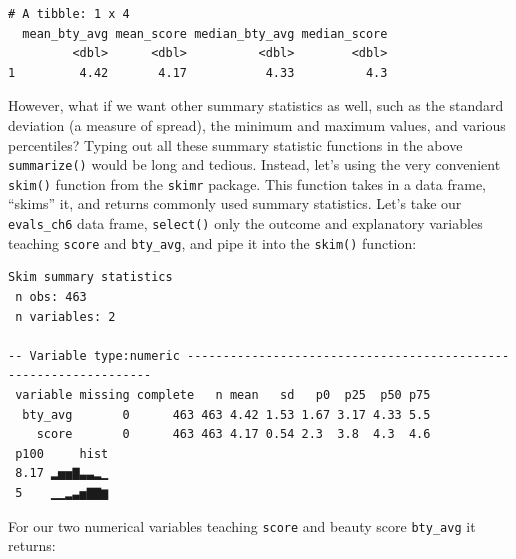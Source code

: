 \documentclass[12pt, krantz2,]{krantz}
\makeatletter
\newenvironment{Shaded}{\begin{snugshade}}{\end{snugshade}}
\newcommand{\KeywordTok}[1]{\textcolor[rgb]{0.27,0.27,0.27}{\textbf{#1}}}
\newcommand{\NormalTok}[1]{#1}
\newcommand{\OperatorTok}[1]{\textcolor[rgb]{0.43,0.43,0.43}{\textbf{#1}}}
\newcommand{\StringTok}[1]{\textcolor[rgb]{0.5,0.5,0.5}{#1}}
\newenvironment{kframe}{%
\medskip{}
\setlength{\fboxsep}{.8em}
 \def\at@end@of@kframe{}%
 \ifinner\ifhmode%
  \def\at@end@of@kframe{\end{minipage}}%
  \begin{minipage}{\columnwidth}%
 \fi\fi%
 \def\FrameCommand##1{\hskip\@totalleftmargin \hskip-\fboxsep
 \colorbox{shadecolor}{##1}\hskip-\fboxsep
     \hskip-\linewidth \hskip-\@totalleftmargin \hskip\columnwidth}%
 \MakeFramed {\advance\hsize-\width
   \@totalleftmargin\z@ \linewidth\hsize
   \@setminipage}}%
 {\par\unskip\endMakeFramed%
 \at@end@of@kframe}
\renewenvironment{Shaded}{\begin{kframe}}{\end{kframe}}
\makeatother
\begin{document}
\begin{verbatim}
# A tibble: 1 x 4
  mean_bty_avg mean_score median_bty_avg median_score
         <dbl>      <dbl>          <dbl>        <dbl>
1         4.42       4.17           4.33          4.3
\end{verbatim}

However, what if we want other summary statistics as well, such as the standard deviation (a measure of spread), the minimum and maximum values, and various percentiles? Typing out all these summary statistic functions in the above \texttt{summarize()} would be long and tedious. Instead, let's using the very convenient \texttt{skim()} function from the \texttt{skimr} package. This function takes in a data frame, ``skims'' it, and returns commonly used summary statistics. Let's take our \texttt{evals\_ch6} data frame, \texttt{select()} only the outcome and explanatory variables teaching \texttt{score} and \texttt{bty\_avg}, and pipe it into the \texttt{skim()} function:

\begin{Shaded}
\end{Shaded}

\begin{verbatim}
Skim summary statistics
 n obs: 463 
 n variables: 2 

-- Variable type:numeric -----------------------------------------------------------------
 variable missing complete   n mean   sd   p0  p25  p50 p75
  bty_avg       0      463 463 4.42 1.53 1.67 3.17 4.33 5.5
    score       0      463 463 4.17 0.54 2.3  3.8  4.3  4.6
 p100     hist
 8.17 ▂▅▅▇▃▃▂▁
 5    ▁▁▂▃▅▇▇▆
\end{verbatim}

For our two numerical variables teaching \texttt{score} and beauty score \texttt{bty\_avg} it returns:
\end{document}
